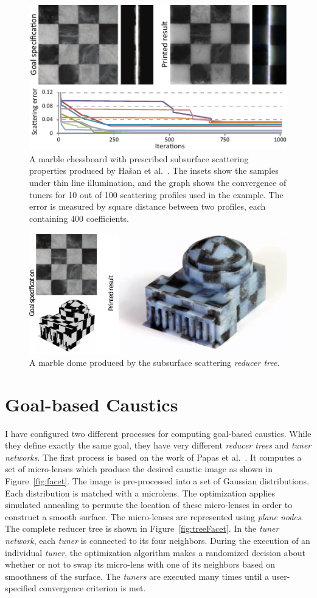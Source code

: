 \begin{figure}[h]
\centering
\includegraphics[width=0.65\linewidth]{figure/fig_chess.pdf}
\caption{
	A marble chessboard with prescribed subsurface scattering properties produced by Ha\v{s}an et al.~.
	The insets show the samples under thin line illumination, and the graph shows the convergence of tuners for 10 out of 100 scattering profiles used in the example. The error is measured by square distance between two profiles, each containing 400 coefficients.}
\label{fig:sub}
\end{figure}

\begin{figure}[h]
\centering
\includegraphics[width=0.75\linewidth]{figure/dome.pdf}
\caption{
	A marble dome produced by the subsurface scattering \emph{reducer tree}.}
\label{fig:dome}
\end{figure}

\section{Goal-based Caustics}
I have configured two different processes for computing goal-based caustics.
While they define exactly the same goal, they have very different \emph{reducer trees} and \emph{tuner networks}.
The first process is based on the work of Papas et al.~.
It computes a set of micro-lenses which produce the desired caustic image as shown in Figure~\ref{fig:facet}.
The image is pre-processed into a set of Gaussian distributions.
Each distribution is matched with a microlens.
The optimization applies simulated annealing to permute the location of these micro-lenses
in order to construct a smooth surface.
The micro-lenses are represented using \emph{plane nodes}.
The complete reducer tree is shown in Figure~\ref{fig:treeFacet}.
In the \emph{tuner network}, each \emph{tuner} is connected to its four neighbors.
During the execution of an individual \emph{tuner},
the optimization algorithm makes a randomized decision
about whether or not to swap its micro-lens with one of its neighbors based on smoothness of the surface.
The \emph{tuners} are executed many times until a user-specified convergence criterion is met. 


